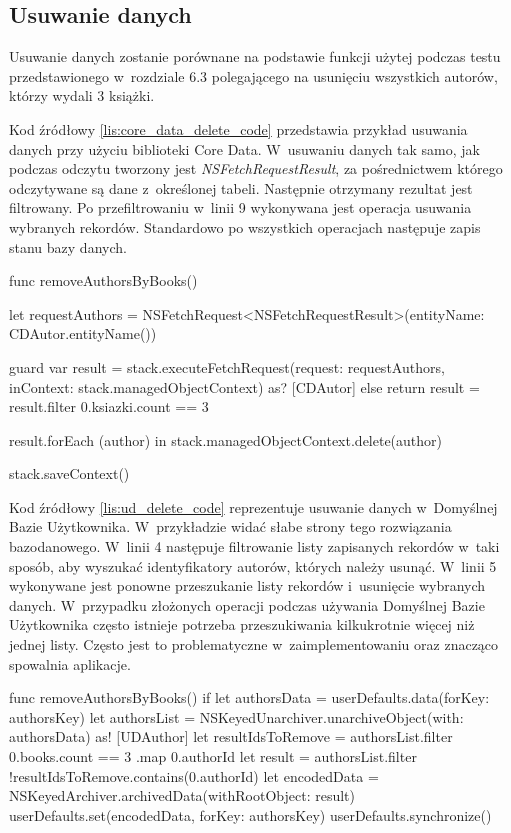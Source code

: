 \subsection{Usuwanie danych}

Usuwanie danych zostanie porównane na podstawie funkcji użytej podczas testu przedstawionego w~rozdziale 6.3 polegającego na usunięciu wszystkich autorów, którzy wydali 3 książki.

 Kod źródłowy \ref{lis:core_data_delete_code} przedstawia przykład usuwania danych przy użyciu biblioteki Core Data. W~usuwaniu danych tak samo, jak podczas odczytu tworzony jest \textit{NSFetchRequestResult}, za pośrednictwem którego odczytywane są dane z~określonej tabeli. Następnie otrzymany rezultat jest filtrowany. Po przefiltrowaniu w~linii 9 wykonywana jest operacja usuwania wybranych rekordów. Standardowo po wszystkich operacjach następuje zapis stanu bazy danych.
 
\begin{code}[
		language=swift,
		caption={Przykład usuwania danych Core Data},
		label={lis:core_data_delete_code},
	]
    func removeAuthorsByBooks() {
        let requestAuthors = NSFetchRequest<NSFetchRequestResult>(entityName: CDAutor.entityName())
        
        guard var result = stack.executeFetchRequest(request: requestAuthors, inContext: stack.managedObjectContext) as? [CDAutor] else { return }
        result = result.filter { 0.ksiazki.count == 3 }
        
        result.forEach { (author) in
            stack.managedObjectContext.delete(author)
        }
        
        stack.saveContext()
    }
 \end{code}
    
Kod źródłowy \ref{lis:ud_delete_code} reprezentuje usuwanie danych w~Domyślnej Bazie Użytkownika. W~przykładzie widać słabe strony tego rozwiązania bazodanowego. W~linii 4 następuje filtrowanie listy zapisanych rekordów w~taki sposób, aby wyszukać identyfikatory autorów, których należy usunąć. W~linii 5 wykonywane jest ponowne przeszukanie listy rekordów i~usunięcie wybranych danych. W~przypadku złożonych operacji podczas używania Domyślnej Bazie Użytkownika często istnieje potrzeba przeszukiwania kilkukrotnie więcej niż jednej listy. Często jest to problematyczne w~zaimplementowaniu oraz znacząco spowalnia aplikacje.
    
\begin{code}[
		language=swift,
		caption={Przykład usuwania danych User Defaults},
		label={lis:ud_delete_code},
	]
        func removeAuthorsByBooks() {
        if  let authorsData = userDefaults.data(forKey: authorsKey) {
            let authorsList = NSKeyedUnarchiver.unarchiveObject(with: authorsData) as! [UDAuthor]
            let resultIdsToRemove = authorsList.filter { 0.books.count == 3 }.map { 0.authorId }
            let result = authorsList.filter { !resultIdsToRemove.contains(0.authorId) }
            let encodedData = NSKeyedArchiver.archivedData(withRootObject: result)
            userDefaults.set(encodedData, forKey: authorsKey)
            userDefaults.synchronize()
        }
    }
\end{code}

